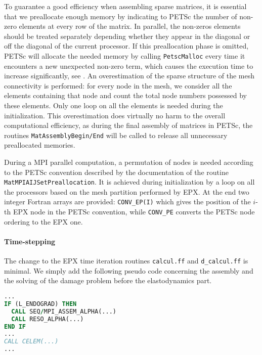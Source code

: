 To guarantee a good efficiency when assembling sparse matrices, it is essential that we preallocate enough memory by indicating to PETSc the number of non-zero elements at every row of the matrix. In parallel, the non-zeros elements should be treated separately depending whether they appear in the diagonal or off the diagonal of the current processor. If this preallocation phase is omitted, PETSc will allocate the needed memory by calling \texttt{PetscMalloc} every time it encounters a new unexpected non-zero term, which causes the execution time to increase significantly, see \cite{PETSc:2015}. An overestimation of the sparse structure of the mesh connectivity is performed: for every node in the mesh, we consider all the elements containing that node and count the total node numbers possessed by these elements. Only one loop on all the elements is needed during the initialization. This overestimation does virtually no harm to the overall computational efficiency, as during the final assembly of matrices in PETSc, the routines \texttt{MatAssemblyBegin/End} will be called to release all unnecessary preallocated memories.

During a MPI parallel computation, a permutation of nodes is needed according to the PETSc convention described by the documentation of the routine \texttt{MatMPIAIJSetPreallocation}. It is achieved during initialization by a loop on all the processors based on the mesh partition performed by EPX. At the end two integer Fortran arrays are provided: \texttt{CONV\_EP(I)} which gives the position of the $i$-th EPX node in the PETSc convention, while \texttt{CONV\_PE} converts the PETSc node ordering to the EPX one.

\paragraph{Time-stepping} The change to the EPX time iteration routines \texttt{calcul.ff} and \texttt{d\_calcul.ff} is minimal. We simply add the following pseudo code concerning the assembly and the solving of the damage problem before the elastodynamics part.
\begin{lstlisting}[language=Fortran]
...
IF (L_ENDOGRAD) THEN
  CALL SEQ/MPI_ASSEM_ALPHA(...)
  CALL RESO_ALPHA(...)
END IF
...
CALL CELEM(...)
...
\end{lstlisting}

